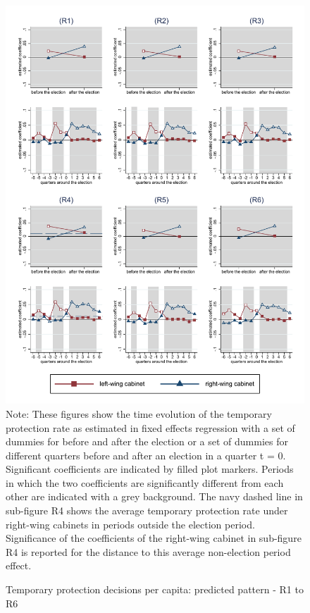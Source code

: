 \documentclass[11pt,a4paper]{scrartcl}
\begin{document}
\clearpage
\FloatBarrier
\begin{figure}[!ht]
	\caption{Temporary protection decisions per capita: predicted pattern - R1 to R6}
	\includegraphics[width=1\textwidth]{../results/decisions/temporary_protection_rate_graphs_R1-R6.pdf}
	\scriptsize{Note: These figures show the time evolution of the temporary protection rate as estimated in fixed effects regression with a set of dummies for before and after the election or a set of dummies for different quarters before and after an election in a quarter t = 0. Significant coefficients are indicated by filled plot markers. Periods in which the two coefficients are significantly different from each other are indicated with a grey background. The navy dashed line in sub-figure R4 shows the average temporary protection rate under right-wing cabinets in periods outside the election period. Significance of the coefficients of the right-wing cabinet in sub-figure R4 is reported for the distance to this average non-election period effect.}
\end{figure}
\end{document}

